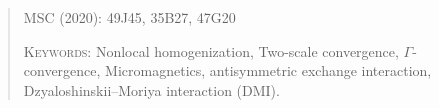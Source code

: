 \documentclass[reqno,11pt]{amsart}
\numberwithin{equation}{section}
\theoremstyle{thmlemcorr}
\numberwithin{theorem}{section}
\theoremstyle{thmlemcorr*}
\theoremstyle{defi}
\theoremstyle{remexample}
\theoremstyle{ass}
\newcommand{\1}{\mathds{1}}
\begin{document}
\begin{abstract}
\vspace{8pt}

\noindent\textsc{MSC (2020): 49J45, 35B27, 47G20} 
\vspace{8pt}

\noindent\textsc{Keywords:} Nonlocal homogenization, Two-scale convergence, $\Gamma$-convergence, Micromagnetics, antisymmetric
exchange interaction, Dzyaloshinskii--Moriya interaction (DMI).
\vspace{8pt}

\end{abstract}
\maketitle
\end{document}
